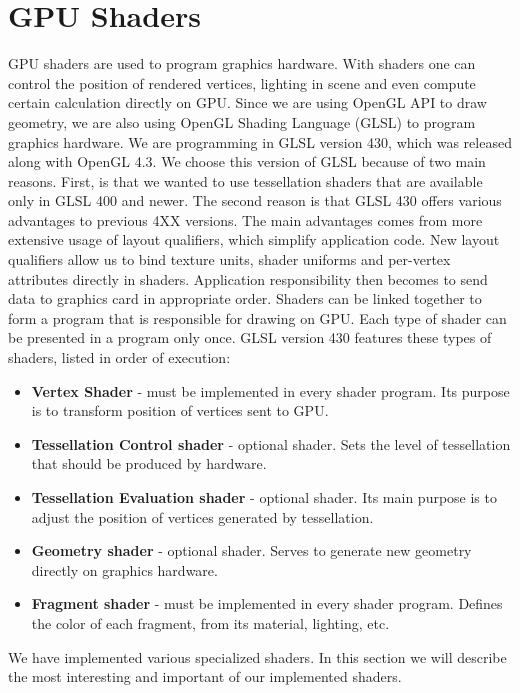 \section{GPU Shaders}

GPU shaders are used to program graphics hardware.
With shaders one can control the position of rendered vertices, lighting in scene and even compute certain calculation directly on GPU.
Since we are using OpenGL API to draw geometry, we are also using OpenGL Shading Language (GLSL) to program graphics hardware.
We are programming in GLSL version 430, which was released along with OpenGL 4.3.
We choose this version of GLSL because of two main reasons.
First, is that we wanted to use tessellation shaders that are available only in GLSL 400 and newer.
The second reason is that GLSL 430 offers various advantages to previous 4XX versions.
The main advantages comes from more extensive usage of layout qualifiers, which simplify application code.
New layout qualifiers allow us to bind texture units, shader uniforms and per-vertex attributes directly in shaders.
Application responsibility then becomes to send data to graphics card in appropriate order.
Shaders can be linked together to form a program that is responsible for drawing on GPU.
Each type of shader can be presented in a program only once.
GLSL version 430 features these types of shaders, listed in order of execution:
\pagebreak
\begin{itemize}
	\itemsep-0.25em 
	\item \textbf{Vertex Shader} - must be implemented in every shader program. Its purpose is to transform position of vertices sent to GPU.
	\item \textbf{Tessellation Control shader} - optional shader. Sets the level of tessellation that should be produced by hardware.
	\item \textbf{Tessellation Evaluation shader} - optional shader. Its main purpose is to adjust the position of vertices generated by tessellation.
	\item \textbf{Geometry shader} - optional shader. Serves to generate new geometry directly on graphics hardware.
	\item \textbf{Fragment shader} - must be implemented in every shader program. Defines the color of each fragment, from its material, lighting, etc.
\end{itemize}
We have implemented various specialized shaders.
In this section we will describe the most interesting and important of our implemented shaders.

